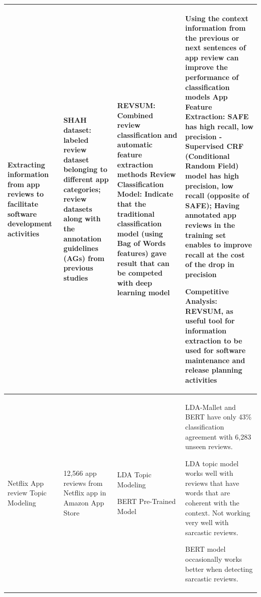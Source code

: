 \documentclass[12pt]{article}
\begin{document}
\begin{table}
\begin{tabular}{|p{2cm}|p{2cm}|p{4cm}|p{5cm}|}
\hline
\centering
Extracting information from app reviews to facilitate software development activities \cite{faiz_ali}
&
\textbf{SHAH dataset:}\newline
labeled review dataset belonging to different app categories;\newline\newline
review datasets along with the annotation guidelines (AGs) from previous studies\newline
&
\textbf{REVSUM:}\newline
Combined review classification and automatic feature extraction methods\newline\newline
\textbf{Review Classification Model:}\newline
Indicate that the traditional classification model (using Bag of Words features) gave result that can be competed with deep learning model
&
Using the context information from the previous or next sentences of app review can improve the performance of classification models\newline\newline
\textbf{App Feature Extraction:}\newline
SAFE has high recall, low precision - Supervised CRF (Conditional Random Field) model has high precision, low recall (opposite of SAFE);\newline
Having annotated app reviews in the training set enables to improve recall at the cost of the drop in precision\newline

\textbf{Competitive Analysis:}\newline
REVSUM, as useful tool for information extraction to be used for software maintenance and release planning activities
\\
\hline
Netflix App review Topic Modeling \cite{jung_kim}
&
12,566 app reviews from Netflix app in Amazon App Store
&
LDA Topic Modeling\newline

BERT Pre-Trained Model
&
LDA-Mallet and BERT have only 43\% classification agreement with 6,283 unseen reviews.

LDA topic model works well with reviews that have words that are coherent with the context. Not working very well with sarcastic reviews.

BERT model occasionally works better when detecting sarcastic reviews.
\end{tabular}
\hline
\end{table}
\end{document}
